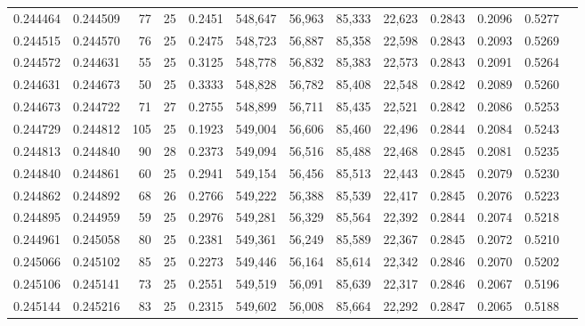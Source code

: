 \begin{tabular}{rrrrrrrrrrrrr}
0.244464 & 0.244509 &  77 &  25 &                                     0.2451 & 548,647 &  56,963 &  85,333 &  22,623 & 0.2843 & 0.2096 & 0.5277 \\
0.244515 & 0.244570 &  76 &  25 &                                     0.2475 & 548,723 &  56,887 &  85,358 &  22,598 & 0.2843 & 0.2093 & 0.5269 \\
0.244572 & 0.244631 &  55 &  25 &                                     0.3125 & 548,778 &  56,832 &  85,383 &  22,573 & 0.2843 & 0.2091 & 0.5264 \\
0.244631 & 0.244673 &  50 &  25 &                                     0.3333 & 548,828 &  56,782 &  85,408 &  22,548 & 0.2842 & 0.2089 & 0.5260 \\
0.244673 & 0.244722 &  71 &  27 &                                     0.2755 & 548,899 &  56,711 &  85,435 &  22,521 & 0.2842 & 0.2086 & 0.5253 \\
0.244729 & 0.244812 & 105 &  25 &                                     0.1923 & 549,004 &  56,606 &  85,460 &  22,496 & 0.2844 & 0.2084 & 0.5243 \\
0.244813 & 0.244840 &  90 &  28 &                                     0.2373 & 549,094 &  56,516 &  85,488 &  22,468 & 0.2845 & 0.2081 & 0.5235 \\
0.244840 & 0.244861 &  60 &  25 &                                     0.2941 & 549,154 &  56,456 &  85,513 &  22,443 & 0.2845 & 0.2079 & 0.5230 \\
0.244862 & 0.244892 &  68 &  26 &                                     0.2766 & 549,222 &  56,388 &  85,539 &  22,417 & 0.2845 & 0.2076 & 0.5223 \\
0.244895 & 0.244959 &  59 &  25 &                                     0.2976 & 549,281 &  56,329 &  85,564 &  22,392 & 0.2844 & 0.2074 & 0.5218 \\
0.244961 & 0.245058 &  80 &  25 &                                     0.2381 & 549,361 &  56,249 &  85,589 &  22,367 & 0.2845 & 0.2072 & 0.5210 \\
0.245066 & 0.245102 &  85 &  25 &                                     0.2273 & 549,446 &  56,164 &  85,614 &  22,342 & 0.2846 & 0.2070 & 0.5202 \\
0.245106 & 0.245141 &  73 &  25 &                                     0.2551 & 549,519 &  56,091 &  85,639 &  22,317 & 0.2846 & 0.2067 & 0.5196 \\
0.245144 & 0.245216 &  83 &  25 &                                     0.2315 & 549,602 &  56,008 &  85,664 &  22,292 & 0.2847 & 0.2065 & 0.5188 \\

\end{tabular}
